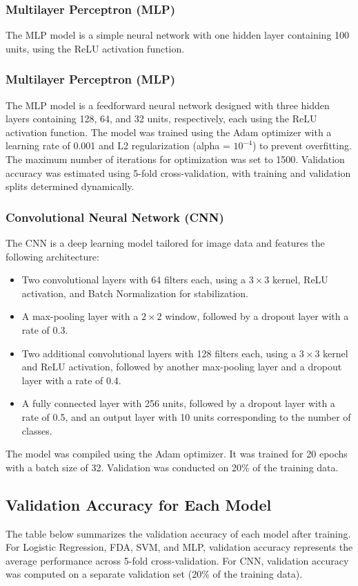 \documentclass{article}
\begin{document}
\subsubsection{Multilayer Perceptron (MLP)}
The MLP model is a simple neural network with one hidden layer containing 100 units, using the ReLU activation function. 

\subsubsection{Multilayer Perceptron (MLP)}
The MLP model is a feedforward neural network designed with three hidden layers containing 128, 64, and 32 units, respectively, each using the ReLU activation function. The model was trained using the Adam optimizer with a learning rate of 0.001 and L2 regularization (alpha = $10^{-4}$) to prevent overfitting. The maximum number of iterations for optimization was set to 1500. Validation accuracy was estimated using 5-fold cross-validation, with training and validation splits determined dynamically.

\subsubsection{Convolutional Neural Network (CNN)}
The CNN is a deep learning model tailored for image data and features the following architecture:
\begin{itemize}
    \item Two convolutional layers with 64 filters each, using a $3 \times 3$ kernel, ReLU activation, and Batch Normalization for stabilization.
    \item A max-pooling layer with a $2 \times 2$ window, followed by a dropout layer with a rate of 0.3.
    \item Two additional convolutional layers with 128 filters each, using a $3 \times 3$ kernel and ReLU activation, followed by another max-pooling layer and a dropout layer with a rate of 0.4.
    \item A fully connected layer with 256 units, followed by a dropout layer with a rate of 0.5, and an output layer with 10 units corresponding to the number of classes.
\end{itemize}
The model was compiled using the Adam optimizer. It was trained for 20 epochs with a batch size of 32. Validation was conducted on 20\% of the training data.

\subsection{Validation Accuracy for Each Model}
The table below summarizes the validation accuracy of each model after training. For Logistic Regression, FDA, SVM, and MLP, validation accuracy represents the average performance across 5-fold cross-validation. For CNN, validation accuracy was computed on a separate validation set (20\% of the training data).
\end{document}
